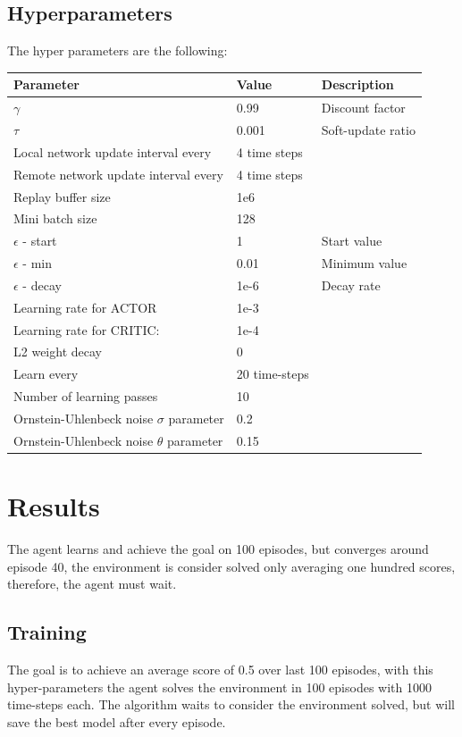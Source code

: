 \documentclass{article}
\begin{document}
\subsection{Hyperparameters}
The hyper parameters are the following:
\begin{table}[!htbp]
\center
\begin{tabular}{l|l|l}
Parameter         & Value   & Description  \\
\hline
$\gamma$ & 0.99 & Discount factor\\
$\tau$ &  0.001 & Soft-update ratio\\
Local network update interval every & 4 time steps &\\
Remote network update interval every & 4 time steps &\\
Replay buffer size & 1e6 &\\
Mini batch size & 128 &\\
$\epsilon$ - start & 1 & Start value\\
$\epsilon$ - min & 0.01 & Minimum value\\
$\epsilon$ - decay & 1e-6 & Decay rate\\
Learning rate for ACTOR & 1e-3 &\\
Learning rate for CRITIC: & 1e-4 & \\
L2 weight decay & 0 &\\
Learn every& 20 time-steps & \\
Number of learning passes& 10 & \\
Ornstein-Uhlenbeck noise $\sigma$ parameter & 0.2 & \\
Ornstein-Uhlenbeck noise $\theta$ parameter & 0.15 &
\end{tabular}
\end{table}
\section{Results}
The agent learns and achieve the goal on 100 episodes, but converges around episode 40, the environment is consider solved only averaging one hundred scores, therefore, the agent must wait.\newline

\subsection{Training}
The goal is to achieve an average score of 0.5 over last 100 episodes, with this hyper-parameters the agent solves the environment in 100 episodes with 1000 time-steps each.\newline
The algorithm waits to consider the environment solved, but will save the best model after every episode.\newline
\end{document}
